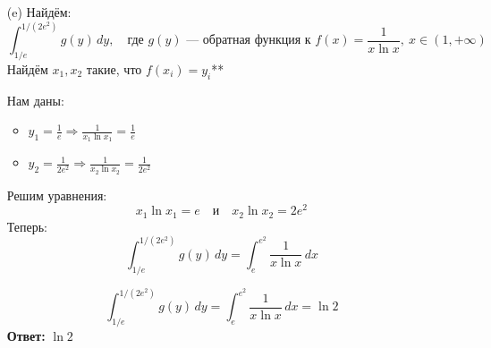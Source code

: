 \documentclass[a4paper]{article}
\begin{document}
\begin{enumerate}
\begin{enumerate}
        \item[(e)]Найдём:
        \[
        \int_{1/e}^{1/(2e^2)} g(y) \, dy,\quad \text{где } g(y) \text{ — обратная функция к } f(x) = \frac{1}{x \ln x},\ x \in (1, +\infty)
        \]
        Найдём \( x_1, x_2 \) такие, что \( f(x_i) = y_i \)**

        Нам даны:
        \begin{itemize}
            \item \( y_1 = \frac{1}{e} \Rightarrow \frac{1}{x_1 \ln x_1} = \frac{1}{e} \)
            \item \( y_2 = \frac{1}{2e^2} \Rightarrow \frac{1}{x_2 \ln x_2} = \frac{1}{2e^2} \)
        \end{itemize}
        Решим уравнения:
        $$ x_1 \ln x_1 = e \quad \text{и} \quad x_2 \ln x_2 = 2e^2 $$
        Теперь:
        \[
        \int_{1/e}^{1/(2e^2)} g(y) \, dy = \int_{e}^{e^2} \frac{1}{x \ln x} \, dx
        \]
        
        \[
        \int_{1/e}^{1/(2e^2)} g(y) \, dy = \int_{e}^{e^2} \frac{1}{x \ln x} \, dx = \ln 2
        \]
        \textbf{Ответ: } $\ln 2$



    \end{enumerate}

\end{enumerate}
\end{document}

